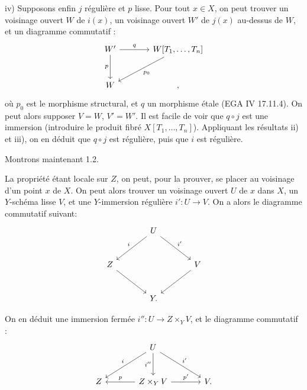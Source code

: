 
iv)
Supposons enfin $j$ régulière et $p$ lisse. Pour tout $x\in X$, on peut trouver un voisinage ouvert $W$ de $i(x)$, un voisinage ouvert $W'$ de $j(x)$ au-dessus de $W$, et un diagramme commutatif :
\[
\begin{tikzcd}[column sep=large,row sep=large]
W' \arrow[r,"q"] \arrow[d,"p"'] & W[T_1,\ldots,T_n] \arrow[dl,"p_0"]\\
W & ,
\end{tikzcd}
\]
où $p_0$ est le morphisme structural, et $q$ un morphisme étale (EGA IV 17.11.4). On peut alors supposer $V=W$, $V'=W'$. Il est facile de voir que $q\circ j$ est une immersion (introduire le produit fibré $X[T_1,\ldots,T_n]$). Appliquant les résultats ii) et iii), on en déduit que $q\circ j$ est régulière, puis que $i$ est régulière.

Montrons maintenant 1.2.

La propriété étant locale sur $Z$, on peut, pour la prouver, se placer au voisinage d'un point $x$ de $X$. On peut alors trouver un voisinage ouvert $U$ de $x$ dans $X$, un $Y$-schéma lisse $V$, et une $Y$-immersion régulière $i':U\to V$. On a alors le diagramme commutatif suivant:
\[
\begin{tikzcd}[column sep=large,row sep=large]
& U \arrow[dl,"i"'] \arrow[dr,"i'"] &\\
Z \arrow[dr] && V \arrow[dl]\\
& Y . &
\end{tikzcd}
\]

On en déduit une immersion fermée $i'':U\to Z\times_Y V$, et le diagramme commutatif :
\[
\begin{tikzcd}[column sep=large,row sep=large]
& U \arrow[dl,"i"'] \arrow[d,"i''"'] \arrow[dr,"i'"] &\\
Z & Z\times_Y V \arrow[l,"p"'] \arrow[r,"p'"] & V.
\end{tikzcd}
\]
